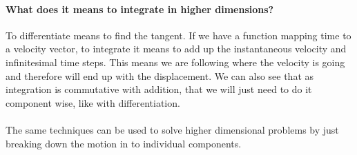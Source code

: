 \documentclass[class=article, crop=false]{standalone}
\begin{document}
\paragraph*{What does it means to integrate in higher dimensions?} To differentiate means to find the tangent. If we have a function mapping time to a velocity vector, to integrate it means to add up the instantaneous velocity and infinitesimal time steps. This means we are following where the velocity is going and therefore will end up with the displacement. We can also see that as integration is commutative with addition, that we will just need to do it component wise, like with differentiation. \\\\

The same techniques can be used to solve higher dimensional problems by just breaking down the motion in to individual components. 
\end{document}
